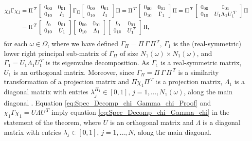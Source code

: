 \documentclass{cmslatex}
\begin{document}
\begin{align}\label{eq:Spec_Decomp_chi_Gamma_chi_Proof}
  \chi_1\Gamma\chi_1&=
  \Pi^{\,T}
  \left[
  \begin{array}{ccc}
    0_{00}&0_{01}\\
    0_{10}&I_1   
    \end{array}
\right]
\Gamma_\Pi
\left[
  \begin{array}{ccc}
    0_{00}&0_{01}\\
    0_{10}&I_1   
    \end{array}
\right]
\Pi
=
\Pi^{\,T}
\left[
  \begin{array}{ccc}
    0_{00}&0_{01}\\
    0_{10}&\Gamma_1   
    \end{array}
\right]
\Pi
=
\Pi^{\,T}
\left[
  \begin{array}{ccc}
    0_{00}&0_{01}\\
    0_{10}&U_1\Lambda_1U_1^{\,T} 
    \end{array}
\right]
\Pi
\notag\\
&=
\Pi^{\,T}
\left[
  \begin{array}{ccc}
    I_0&0_{01}\\
    0_{10}&U_1 
    \end{array}
\right]    
\left[
  \begin{array}{ccc}
    0_{00}&0_{01}\\
    0_{10}&\Lambda_1
    \end{array}
\right]    
\left[
  \begin{array}{ccc}
    I_0&0_{01}\\
    0_{10}&U_1^{\,T} 
    \end{array}
\right]    
\Pi,
\end{align}
%
for each $\omega\in\Omega$, where we have defined $\Gamma_\Pi=\Pi\,\Gamma\,\Pi^{\,T}$, $\Gamma_1$ is the
(real-symmetric) lower right 
principal sub-matrix of $\Gamma_\Pi$ of size $N_1(\omega)\times N_1(\omega)$, and 
$\Gamma_1=U_1\Lambda_1U_1^{\,T}$ is its eigenvalue decomposition. As $\Gamma_1$ is a
real-symmetric matrix, $U_1$ is an orthogonal matrix. Moreover, since
$\Gamma_\Pi=\Pi\,\Gamma\,\Pi^{\,T}$ is a similarity transformation of a projection matrix
and $\Pi\chi_1\Pi^{\,T}$ is a projection matrix, $\Lambda_1$ is a diagonal matrix
with entries $\lambda_j^{\Pi_1}\in[0,1]$, $j=1,\ldots,N_1 (\omega)$, along the main diagonal
\cite{Demmel:1997,Halmos-1958}. Equation
\eqref{eq:Spec_Decomp_chi_Gamma_chi_Proof} and $\chi_1\Gamma\chi_1=U\Lambda U^{\,T}$ 
imply equation \eqref{eq:Spec_Decomp_chi_Gamma_chi} in the statement
of the theorem, where $U$ is an orthogonal matrix and $\Lambda$ is a
diagonal matrix with entries $\lambda_j\in[0,1]$, $j=1,\ldots,N$, along the main
diagonal.    
\end{document}
